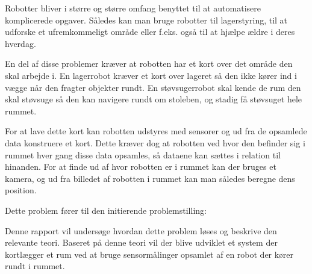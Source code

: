 Robotter bliver i større og større omfang benyttet til at automatisere komplicerede opgaver.
Således kan man bruge robotter til lagerstyring, til at udforske et ufremkommeligt område eller f.eks. også til at hjælpe ældre i deres hverdag.

En del af disse problemer kræver at robotten har et kort over det område den skal arbejde i.
En lagerrobot kræver et kort over lageret så den ikke kører ind i vægge når den fragter objekter rundt.
En støvsugerrobot skal kende de rum den skal støvsuge så den kan navigere rundt om stoleben, og stadig få støvsuget hele rummet.

For at lave dette kort kan robotten udstyres med sensorer og ud fra de opsamlede data konstruere et kort.
Dette kræver dog at robotten ved hvor den befinder sig i rummet hver gang disse data opsamles, så dataene kan sættes i relation til hinanden.
For at finde ud af hvor robotten er i rummet kan der bruges et kamera, og ud fra billedet af robotten i rummet kan man således beregne dens position.

Dette problem fører til den initierende problemstilling:

Denne rapport vil undersøge hvordan dette problem løses og beskrive den relevante teori.
Baseret på denne teori vil der blive udviklet et system der kortlægger et rum ved at bruge sensormålinger opsamlet af en robot der kører rundt i rummet.




